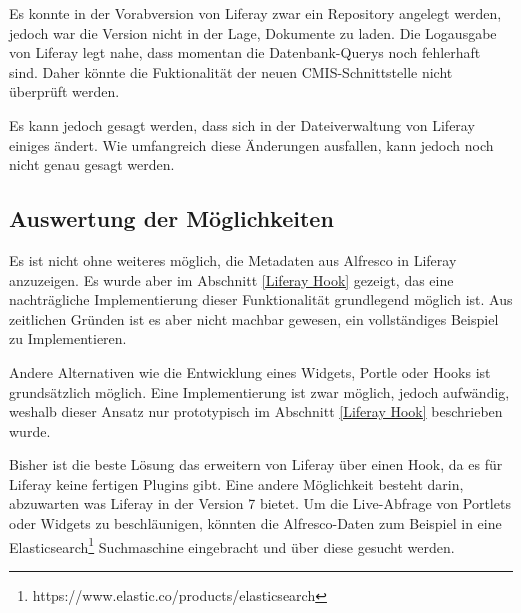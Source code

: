 Es konnte in der Vorabversion von Liferay zwar ein Repository angelegt werden, jedoch war die Version nicht in der Lage, Dokumente zu laden. Die Logausgabe von Liferay legt nahe, dass momentan die Datenbank-Querys noch fehlerhaft sind. Daher k\"onnte die Fuktionalit\"at der neuen \ac{CMIS}-Schnittstelle nicht \"uberpr\"uft werden.

Es kann jedoch gesagt werden, dass sich in der Dateiverwaltung von Liferay einiges \"andert. Wie umfangreich diese \"Anderungen ausfallen, kann jedoch noch nicht genau gesagt werden.

\subsection{Auswertung der M\"oglichkeiten}
Es ist nicht ohne weiteres m\"oglich, die Metadaten aus Alfresco in Liferay anzuzeigen. Es wurde aber im Abschnitt \ref{Liferay Hook} gezeigt, das eine nachtr\"agliche Implementierung dieser Funktionalit\"at grundlegend m\"oglich ist. Aus zeitlichen Gr\"unden ist es aber nicht machbar gewesen, ein vollst\"andiges Beispiel zu Implementieren.

Andere Alternativen wie die Entwicklung eines Widgets, Portle oder Hooks ist grunds\"atzlich m\"oglich. Eine Implementierung ist zwar m\"oglich, jedoch aufw\"andig, weshalb dieser Ansatz nur prototypisch im Abschnitt \ref{Liferay Hook} beschrieben wurde.

Bisher ist die beste L\"osung das erweitern von Liferay \"uber einen Hook, da es f\"ur Liferay keine fertigen Plugins gibt. Eine andere M\"oglichkeit besteht darin, abzuwarten was Liferay in der Version 7 bietet. Um die Live-Abfrage von Portlets oder Widgets zu beschl\"aunigen, k\"onnten die Alfresco-Daten zum Beispiel in eine Elasticsearch\footnote{https://www.elastic.co/products/elasticsearch} Suchmaschine eingebracht und \"uber diese gesucht werden. \cite{Wiki_Elastic} \cite{elastic}
